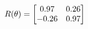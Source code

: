 \documentclass[preview]{standalone}
\begin{document}
\begin{align*}
\special{dvisvgm:raw <g id='unique000'>}R(\theta) = \begin{bmatrix}0.97 & 0.26\\-0.26 & 0.97\end{bmatrix}\special{dvisvgm:raw </g>}
\end{align*}
\end{document}
